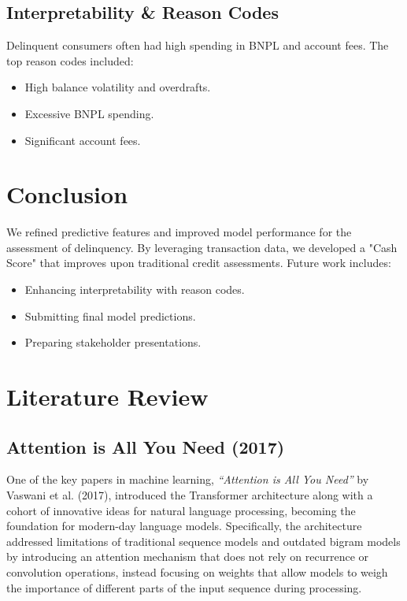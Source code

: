 \documentclass[12pt,letterpaper]{article}
\begin{document}
\subsection{Interpretability \& Reason Codes}
Delinquent consumers often had high spending in BNPL and account fees. The top reason codes included:
\begin{itemize}
    \item High balance volatility and overdrafts.
    \item Excessive BNPL spending.
    \item Significant account fees.
\end{itemize}

\section{Conclusion}
We refined predictive features and improved model performance for the assessment of delinquency. By leveraging transaction data, we developed a "Cash Score" that improves upon traditional credit assessments. Future work includes:
\begin{itemize}
    \item Enhancing interpretability with reason codes.
    \item Submitting final model predictions.
    \item Preparing stakeholder presentations.
\end{itemize}


\section{Literature Review}

\subsection{Attention is All You Need (2017)}

One of the key papers in machine learning, \textit{“Attention is All You Need”} by Vaswani et al. (2017), introduced the Transformer architecture along with a cohort of innovative ideas for natural language processing, becoming the foundation for modern-day language models. Specifically, the architecture addressed limitations of traditional sequence models and outdated bigram models by introducing an attention mechanism that does not rely on recurrence or convolution operations, instead focusing on weights that allow models to weigh the importance of different parts of the input sequence during processing.
\end{document}
